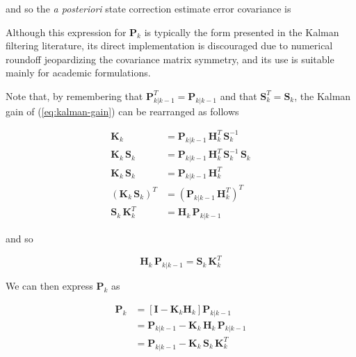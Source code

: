 and so the \textit{a posteriori} state correction estimate error covariance is


Although this expression for $\mathbf{P}_k$ is typically the form presented in the Kalman
filtering literature, its direct implementation is discouraged due to numerical roundoff
jeopardizing the covariance matrix symmetry, and its use is suitable mainly for academic formulations.

Note that, by remembering that $\mathbf{P}_{k|k-1}^T = \mathbf{P}_{k|k-1}$ and that 
$\mathbf{S}_k^T = \mathbf{S}_k$, the Kalman gain of (\ref{eq:kalman-gain}) can be
rearranged as follows

\begin{equation*}
    \begin{aligned}
        \mathbf{K}_{k} &= \mathbf{P}_{k|k-1} \, \mathbf{H}_{k}^T \, \mathbf{S}_{k}^{-1} \\
        \mathbf{K}_{k} \, \mathbf{S}_{k} &= \mathbf{P}_{k|k-1} \, \mathbf{H}_{k}^T \, \mathbf{S}_{k}^{-1} \, \mathbf{S}_{k} \\
        \mathbf{K}_{k} \, \mathbf{S}_{k} &= \mathbf{P}_{k|k-1} \, \mathbf{H}_{k}^T\\
        \left( \mathbf{K}_{k} \, \mathbf{S}_{k} \right)^T &= \left( \mathbf{P}_{k|k-1} \, \mathbf{H}_{k}^T \right)^T \\
        \mathbf{S}_{k} \, \mathbf{K}_{k}^T &= \mathbf{H}_{k} \,\mathbf{P}_{k|k-1}
    \end{aligned}
\end{equation*}

and so

\begin{equation*}
    \mathbf{H}_{k} \,\mathbf{P}_{k|k-1} = \mathbf{S}_{k} \, \mathbf{K}_{k}^T
\end{equation*}

We can then express $\mathbf{P}_k$ as

\begin{equation*}
    \begin{aligned}
        \mathbf{P}_{k} &= \left[ \mathbf{I} - \mathbf{K}_k \mathbf{H}_k \right] \mathbf{P}_{k|k-1} \\
        &= \mathbf{P}_{k|k-1} - \mathbf{K}_{k} \, \mathbf{H}_{k} \, \mathbf{P}_{k|k-1} \\
        &= \mathbf{P}_{k|k-1} - \mathbf{K}_{k} \, \mathbf{S}_{k} \, \mathbf{K}_{k}^T
    \end{aligned}
\end{equation*}

